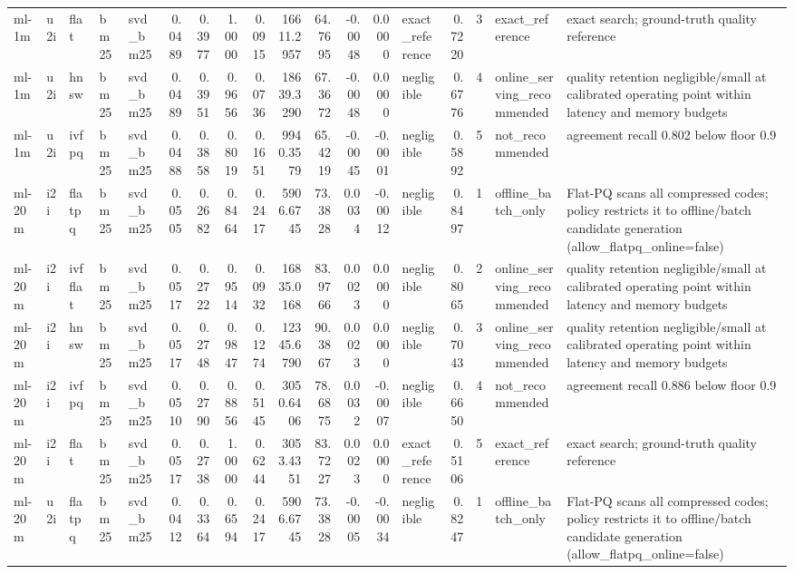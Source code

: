 \begin{tabular}{lllllrrrrrrrrlrrll}
ml-1m & u2i & flat & bm25 & svd_bm25 & 0.0489 & 0.3977 & 1.0000 & 0.0915 & 16611.2957 & 64.7695 & -0.0048 & 0.0000 & exact_reference & 0.7220 & 3 & exact_reference & exact search; ground-truth quality reference \\
ml-1m & u2i & hnsw & bm25 & svd_bm25 & 0.0489 & 0.3951 & 0.9656 & 0.0736 & 18639.3290 & 67.3672 & -0.0048 & 0.0000 & negligible & 0.6776 & 4 & online_serving_recommended & quality retention negligible/small at calibrated operating point within latency and memory budgets \\
ml-1m & u2i & ivfpq & bm25 & svd_bm25 & 0.0488 & 0.3858 & 0.8019 & 0.1651 & 9940.3579 & 65.4219 & -0.0045 & -0.0001 & negligible & 0.5892 & 5 & not_recommended & agreement recall 0.802 below floor 0.9 \\
ml-20m & i2i & flatpq & bm25 & svd_bm25 & 0.0505 & 0.2682 & 0.8464 & 0.2417 & 5906.6745 & 73.3828 & 0.0034 & -0.0012 & negligible & 0.8497 & 1 & offline_batch_only & Flat-PQ scans all compressed codes; policy restricts it to offline/batch candidate generation (allow_flatpq_online=false) \\
ml-20m & i2i & ivfflat & bm25 & svd_bm25 & 0.0517 & 0.2722 & 0.9514 & 0.0932 & 16835.0168 & 83.9766 & 0.0023 & 0.0000 & negligible & 0.8065 & 2 & online_serving_recommended & quality retention negligible/small at calibrated operating point within latency and memory budgets \\
ml-20m & i2i & hnsw & bm25 & svd_bm25 & 0.0517 & 0.2748 & 0.9847 & 0.1274 & 12345.6790 & 90.3867 & 0.0023 & 0.0000 & negligible & 0.7043 & 3 & online_serving_recommended & quality retention negligible/small at calibrated operating point within latency and memory budgets \\
ml-20m & i2i & ivfpq & bm25 & svd_bm25 & 0.0510 & 0.2790 & 0.8856 & 0.5145 & 3050.6406 & 78.6875 & 0.0032 & -0.0007 & negligible & 0.6650 & 4 & not_recommended & agreement recall 0.886 below floor 0.9 \\
ml-20m & i2i & flat & bm25 & svd_bm25 & 0.0517 & 0.2738 & 1.0000 & 0.6244 & 3053.4351 & 83.7227 & 0.0023 & 0.0000 & exact_reference & 0.5106 & 5 & exact_reference & exact search; ground-truth quality reference \\
ml-20m & u2i & flatpq & bm25 & svd_bm25 & 0.0412 & 0.3364 & 0.6594 & 0.2417 & 5906.6745 & 73.3828 & -0.0005 & -0.0034 & negligible & 0.8247 & 1 & offline_batch_only & Flat-PQ scans all compressed codes; policy restricts it to offline/batch candidate generation (allow_flatpq_online=false) \\

\end{tabular}
